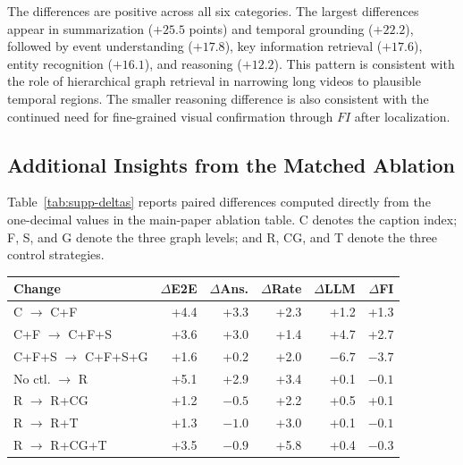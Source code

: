 The differences are positive across all six categories.
The largest differences appear in summarization ($+25.5$ points) and temporal grounding ($+22.2$), followed by event understanding ($+17.8$), key information retrieval ($+17.6$), entity recognition ($+16.1$), and reasoning ($+12.2$).
This pattern is consistent with the role of hierarchical graph retrieval in narrowing long videos to plausible temporal regions.
The smaller reasoning difference is also consistent with the continued need for fine-grained visual confirmation through $FI$ after localization.

\subsection{Additional Insights from the Matched Ablation}

Table~\ref{tab:supp-deltas} reports paired differences computed directly from the one-decimal values in the main-paper ablation table.
C denotes the caption index; F, S, and G denote the three graph levels; and R, CG, and T denote the three control strategies.

\begin{center}
  \centering
  \small
  \setlength{\tabcolsep}{1.9pt}
  \begin{tabular}{@{}lrrrrr@{}}
    \toprule
    \textbf{Change} &
    \textbf{$\Delta$E2E} &
    \textbf{$\Delta$Ans.} &
    \textbf{$\Delta$Rate} &
    \textbf{$\Delta$LLM} &
    \textbf{$\Delta$FI} \\
    \midrule
    C $\rightarrow$ C+F                 & +4.4 & +3.3 & +2.3 & +1.2 & +1.3 \\
    C+F $\rightarrow$ C+F+S             & +3.6 & +3.0 & +1.4 & +4.7 & +2.7 \\
    C+F+S $\rightarrow$ C+F+S+G          & +1.6 & +0.2 & +2.0 & $-6.7$ & $-3.7$ \\
    \midrule
    No ctl. $\rightarrow$ R              & +5.1 & +2.9 & +3.4 & +0.1 & $-0.1$ \\
    R $\rightarrow$ R+CG                & +1.2 & $-0.5$ & +2.2 & +0.5 & +0.1 \\
    R $\rightarrow$ R+T                 & +1.3 & $-1.0$ & +3.0 & +0.1 & $-0.1$ \\
    R $\rightarrow$ R+CG+T              & +3.5 & $-0.9$ & +5.8 & +0.4 & $-0.3$ \\
    \bottomrule
  \end{tabular}
  \label{tab:supp-deltas}
\end{center}

